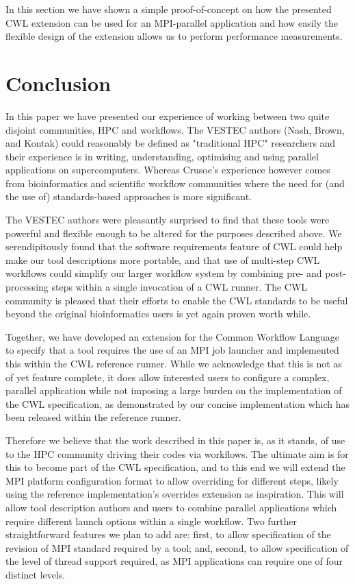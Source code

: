 \documentclass[conference]{IEEEtran}
\begin{document}
In this section we have shown a simple proof-of-concept on how the presented CWL extension can be used for an MPI-parallel application and how easily the flexible design of the extension allows us to perform performance measurements.


\section{Conclusion}
\label{sec:conclusions}

In this paper we have presented our experience of working between two quite disjoint communities, HPC and workflows. The VESTEC authors (Nash, Brown, and Kontak) could reasonably be defined as "traditional HPC" researchers and their experience is in writing, understanding, optimising and using parallel applications on supercomputers. Whereas Crusoe's experience however comes from bioinformatics and scientific workflow communities where the need for (and the use of) standards-based approaches is more significant.

The VESTEC authors were pleasantly surprised to find that these tools were powerful and flexible enough to be altered for the purposes described above. We serendipitously found that the software requirements feature of CWL could help make our tool descriptions more portable, and that use of multi-step CWL workflows could simplify our larger workflow system by combining pre- and post-processing steps within a single invocation of a CWL runner. The CWL community is pleased that their efforts to enable the CWL standards to be useful beyond the original bioinformatics users is yet again proven worth while.

Together, we have developed an extension for the Common Workflow Language to specify that a tool requires the use of an MPI job launcher and implemented this within the CWL reference runner. While we acknowledge that this is not as of yet feature complete, it does allow interested users to configure a complex, parallel application while not imposing a large burden on the implementation of the CWL specification, as demonstrated by our concise implementation which has been released within the reference runner.

Therefore we believe that the work described in this paper is, as it stands, of use to the HPC community driving their codes via workflows. The ultimate aim is for this to become part of the CWL specification, and to this end we will extend the MPI platform configuration format to allow overriding for different steps, likely using the reference implementation's overrides extension as inspiration. This will allow tool description authors and users to combine parallel applications which require different launch options within a single workflow. Two further straightforward features we plan to add are: first, to allow specification of the revision of MPI standard required by a tool; and, second, to allow specification of the level of thread support required, as MPI applications can require one of four distinct levels.
\end{document}
